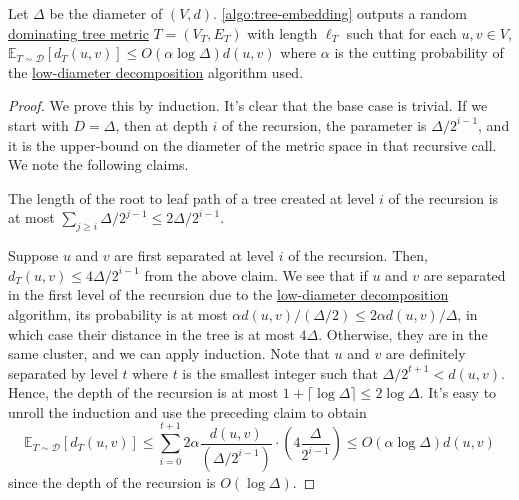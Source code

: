 \begin{theorem}\label{thm:tree-embed}
  Let \(\Delta \) be the diameter of \((V, d)\). \autoref{algo:tree-embedding} outputs a random \hyperref[def:dominating-tree-metric]{dominating tree metric} \(T = (V_T, E_T)\) with length \(\ell _T\) such that for each \(u, v \in V\), \(\mathbb{E}_{T \sim \mathcal{D} }[d_T(u, v)] \leq O(\alpha \log \Delta ) d(u, v)\) where \(\alpha \) is the cutting probability of the \hyperref[def:low-diameter-decomposition]{low-diameter decomposition} algorithm used.
\end{theorem}
\begin{proof}
  We prove this by induction. It's clear that the base case is trivial. If we start with \(D = \Delta \), then at depth \(i\) of the recursion, the parameter is \(\Delta / 2^{i-1}\), and it is the upper-bound on the diameter of the metric space in that recursive call. We note the following claims.

  \begin{claim}
    The length of the root to leaf path of a tree created at level \(i\) of the recursion is at most \(\sum_{j \geq i} \Delta / 2^{j-1} \leq 2 \Delta / 2^{i-1} \).
  \end{claim}

  Suppose \(u\) and \(v\) are first separated at level \(i\) of the recursion. Then, \(d_T(u, v) \leq 4 \Delta / 2^{i-1}\) from the above claim. We see that if \(u\) and \(v\) are separated in the first level of the recursion due to the \hyperref[def:low-diameter-decomposition]{low-diameter decomposition} algorithm, its probability is at most \(\alpha d(u, v) / (\Delta / 2) \leq 2 \alpha d(u, v) / \Delta \), in which case their distance in the tree is at most \(4 \Delta \). Otherwise, they are in the same cluster, and we can apply induction. Note that \(u\) and \(v\) are definitely separated by level \(t\) where \(t\) is the smallest integer such that \(\Delta / 2^{t+1} < d(u, v)\). Hence, the depth of the recursion is at most \(1 + \lceil \log \Delta \rceil \leq 2 \log \Delta \). It's easy to unroll the induction and use the preceding claim to obtain
  \begin{equation}\label{eq:tree-embed}
    \mathbb{E}_{T \sim \mathcal{D} }[d_T(u, v)]
    \leq \sum_{i=0}^{t+1} 2\alpha \frac{d(u, v)}{(\Delta / 2^{i-1})} \cdot \left( 4 \frac{\Delta }{2^{i-1}} \right)
    \leq O(\alpha \log \Delta ) d(u, v)
  \end{equation}
  since the depth of the recursion is \(O(\log \Delta )\).
\end{proof}

